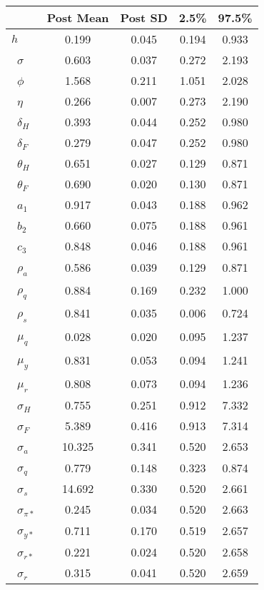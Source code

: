 \begin{tiny}\begin{tabular}{lcccc}
\hline
&\textbf{Post Mean}&\textbf{Post SD}&\textbf{2.5\%}&\textbf{97.5\%}\\\hline
\textbf{$ h             $}&0.199&0.045&0.194&0.933\\\
\textbf{$ \sigma        $}&0.603&0.037&0.272&2.193\\\
\textbf{$ \phi          $}&1.568&0.211&1.051&2.028\\\
\textbf{$ \eta          $}&0.266&0.007&0.273&2.190\\\
\textbf{$ \delta_{H}    $}&0.393&0.044&0.252&0.980\\\
\textbf{$ \delta_{F}    $}&0.279&0.047&0.252&0.980\\\
\textbf{$ \theta_{H}    $}&0.651&0.027&0.129&0.871\\\
\textbf{$ \theta_{F}    $}&0.690&0.020&0.130&0.871\\\
\textbf{$ a_{1}         $}&0.917&0.043&0.188&0.962\\\
\textbf{$ b_{2}         $}&0.660&0.075&0.188&0.961\\\
\textbf{$ c_{3}         $}&0.848&0.046&0.188&0.961\\\
\textbf{$ \rho_{a}      $}&0.586&0.039&0.129&0.871\\\
\textbf{$ \rho_{q}      $}&0.884&0.169&0.232&1.000\\\
\textbf{$ \rho_{s}      $}&0.841&0.035&0.006&0.724\\\
\textbf{$ \mu_{q}       $}&0.028&0.020&0.095&1.237\\\
\textbf{$ \mu_{y}       $}&0.831&0.053&0.094&1.241\\\
\textbf{$ \mu_{r}       $}&0.808&0.073&0.094&1.236\\\
\textbf{$ \sigma_{H}    $}&0.755&0.251&0.912&7.332\\\
\textbf{$ \sigma_{F}    $}&5.389&0.416&0.913&7.314\\\
\textbf{$ \sigma_{a}    $}&10.325&0.341&0.520&2.653\\\
\textbf{$ \sigma_{q}    $}&0.779&0.148&0.323&0.874\\\
\textbf{$ \sigma_{s}    $}&14.692&0.330&0.520&2.661\\\
\textbf{$ \sigma_{\pi*} $}&0.245&0.034&0.520&2.663\\\
\textbf{$ \sigma_{y*}   $}&0.711&0.170&0.519&2.657\\\
\textbf{$ \sigma_{r*}   $}&0.221&0.024&0.520&2.658\\\
\textbf{$ \sigma_{r}    $}&0.315&0.041&0.520&2.659\\\hline
\end{tabular}
\end{tiny}